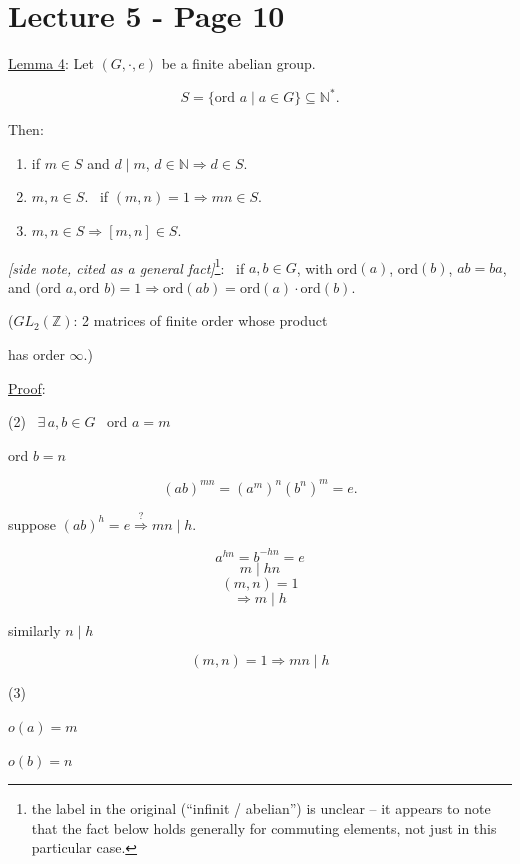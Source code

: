 \section*{Lecture 5 - Page 10}

\noindent\underline{Lemma 4}: Let $(G,\cdot,e)$ be a finite abelian group.

\[
S=\{\text{ord } a \mid a\in G\} \subseteq \mathbb{N}^*.
\]

\bigskip
\noindent Then:

\begin{enumerate}
\item[(1)] if $m\in S$ and $d\mid m$, $d\in\mathbb{N} \Rightarrow d\in S$.
\item[(2)] $m,n\in S$. \ if $(m,n)=1 \Rightarrow mn\in S$.
\item[(3)] $m,n\in S \Rightarrow [m,n]\in S$.
\end{enumerate}

\bigskip
\noindent\textit{[side note, cited as a general fact]}\footnote{the label in the original (``infinit / abelian'') is unclear -- it appears to note that the fact below holds generally for commuting elements, not just in this particular case.}: \ if $a,b\in G$, with ord$(a)$, ord$(b)$, $ab=ba$, and $\big(\text{ord } a,\text{ord } b\big)=1 \Rightarrow \text{ord}(ab)=\text{ord}(a)\cdot\text{ord}(b)$.

\bigskip
\noindent\big($GL_2(\mathbb{Z})$: 2 matrices of finite order whose product

\noindent has order $\infty$.\big)

\bigskip
\noindent\underline{Proof}:

\bigskip
\noindent (2) \ $\exists\, a,b\in G$ \ ord $a=m$

\noindent ord $b=n$

\[
(ab)^{mn} = (a^m)^n(b^n)^m = e.
\]

\noindent suppose $(ab)^h=e \overset{?}{\Longrightarrow} mn\mid h$.

\[
a^{hn}=b^{-hn}=e
\]
\[
m\mid hn
\]
\[
(m,n)=1
\]
\[
\Rightarrow m\mid h
\]

\noindent similarly $n\mid h$

\[
(m,n)=1 \Rightarrow mn\mid h
\]

\bigskip
\noindent (3)

\noindent $o(a)=m$

\noindent $o(b)=n$
